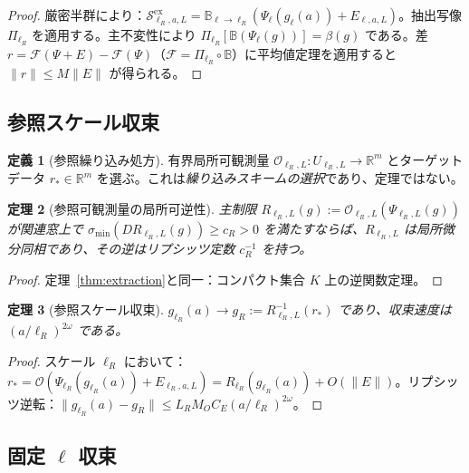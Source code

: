 \documentclass[12pt]{article}
\theoremstyle{plain}
\newtheorem{theorem}{定理}[section]
\theoremstyle{definition}
\newtheorem{definition}[theorem]{定義}
\numberwithin{equation}{section}
\newcommand{\R}{\mathbb{R}}
\newcommand{\ex}{\mathrm{ex}}
\begin{document}
\begin{proof}
厳密半群により：$\mathcal{S}^{\ex}_{\ell_R,a,L}=\mathbb{B}_{\ell\to\ell_R}(\Psi_\ell(g_\ell(a))+E_{\ell,a,L})$。抽出写像 $\Pi_{\ell_R}$ を適用する。主不変性により $\Pi_{\ell_R}[\mathbb{B}(\Psi_\ell(g))]=\beta(g)$ である。差 $r=\mathcal{F}(\Psi+E)-\mathcal{F}(\Psi)$（$\mathcal{F}=\Pi_{\ell_R}\circ\mathbb{B}$）に平均値定理を適用すると $\|r\|\leq M\|E\|$ が得られる。
\end{proof}

\subsection{参照スケール収束}

\begin{definition}[参照繰り込み処方]\label{def:refprescription}
有界局所可観測量 $\mathcal{O}_{\ell_R,L}:U_{\ell_R,L}\to\R^m$ とターゲットデータ $r_*\in\R^m$ を選ぶ。これは\emph{繰り込みスキームの選択}であり、定理ではない。
\end{definition}

\begin{theorem}[参照可観測量の局所可逆性]\label{thm:refinvert}
主制限 $R_{\ell_R,L}(g):=\mathcal{O}_{\ell_R,L}(\Psi_{\ell_R,L}(g))$ が関連窓上で $\sigma_{\min}(DR_{\ell_R,L}(g))\geq c_R>0$ を満たすならば、$R_{\ell_R,L}$ は局所微分同相であり、その逆はリプシッツ定数 $c_R^{-1}$ を持つ。
\end{theorem}

\begin{proof}
定理~\ref{thm:extraction}と同一：コンパクト集合 $K$ 上の逆関数定理。
\end{proof}

\begin{theorem}[参照スケール収束]\label{thm:refscaleconv}
$g_{\ell_R}(a)\to g_R:=R_{\ell_R,L}^{-1}(r_*)$ であり、収束速度は $(a/\ell_R)^{2\omega}$ である。
\end{theorem}

\begin{proof}
スケール $\ell_R$ において：$r_*=\mathcal{O}(\Psi_{\ell_R}(g_{\ell_R}(a))+E_{\ell_R,a,L})=R_{\ell_R}(g_{\ell_R}(a))+O(\|E\|)$。リプシッツ逆転：$\|g_{\ell_R}(a)-g_R\|\leq L_R M_O C_E(a/\ell_R)^{2\omega}$。
\end{proof}

\subsection{固定 $\ell$ 収束}
\end{document}
